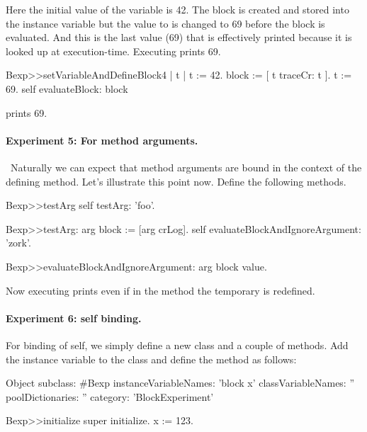 \documentclass[a4paper,10pt,twoside]{book}
\begin{document}
Here the initial value of the variable  is 42. The block is created and stored into the instance variable  but the value to  is changed to 69 before the block is evaluated. And this is the last value (69) that is effectively printed because it is looked up at execution-time. Executing  prints 69.



\begin{code}{}
Bexp>>setVariableAndDefineBlock4
	| t |
	t := 42.
	block := [ t traceCr: t ].
	t := 69.
	self evaluateBlock: block
\end{code}

 prints 69.

\paragraph{Experiment 5: For method arguments.}\
Naturally we can expect that method arguments are bound in the context of the defining method. Let's illustrate this point now. Define the following methods.

\begin{code}{}
Bexp>>testArg
	self testArg: 'foo'.

Bexp>>testArg: arg
	block := [arg crLog].
	self evaluateBlockAndIgnoreArgument: 'zork'.

Bexp>>evaluateBlockAndIgnoreArgument: arg
	block value.
\end{code}

Now executing  prints  even if in the method  the temporary  is redefined.

\paragraph{Experiment 6: self binding.}
For binding of self, we simply define a new class and a couple of methods.
Add the instance variable \ct{x} to the class \ct{Bexp} and define the  method as follows:

\begin{code}{}
Object subclass: #Bexp
	instanceVariableNames: 'block x'
	classVariableNames: ''
	poolDictionaries: ''
	category: 'BlockExperiment'

Bexp>>initialize
    super initialize.
	x := 123.
\end{code}
\end{document}
